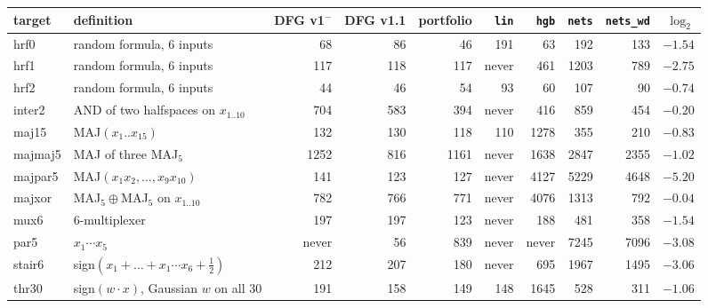 \begin{tabular}{llrrrrrrrr}
\toprule
target & definition & DFG v1$^-$ & DFG v1.1 & portfolio & \texttt{lin} & \texttt{hgb} & \texttt{nets} & \texttt{nets\_wd} & $\log_2$\\
\midrule
hrf0 & random formula, 6 inputs & 68 & 86 & 46 & 191 & 63 & 192 & 133 & $-1.54$\\
hrf1 & random formula, 6 inputs & 117 & 118 & 117 & never & 461 & 1203 & 789 & $-2.75$\\
hrf2 & random formula, 6 inputs & 44 & 46 & 54 & 93 & 60 & 107 & 90 & $-0.74$\\
inter2 & AND of two halfspaces on $x_{1..10}$ & 704 & 583 & 394 & never & 416 & 859 & 454 & $-0.20$\\
maj15 & MAJ$(x_1..x_{15})$ & 132 & 130 & 118 & 110 & 1278 & 355 & 210 & $-0.83$\\
majmaj5 & MAJ of three MAJ$_5$ & 1252 & 816 & 1161 & never & 1638 & 2847 & 2355 & $-1.02$\\
majpar5 & MAJ$(x_1x_2,\dots,x_9x_{10})$ & 141 & 123 & 127 & never & 4127 & 5229 & 4648 & $-5.20$\\
majxor & MAJ$_5\oplus$MAJ$_5$ on $x_{1..10}$ & 782 & 766 & 771 & never & 4076 & 1313 & 792 & $-0.04$\\
mux6 & 6-multiplexer & 197 & 197 & 123 & never & 188 & 481 & 358 & $-1.54$\\
par5 & $x_1\cdots x_5$ & never & 56 & 839 & never & never & 7245 & 7096 & $-3.08$\\
stair6 & sign$(x_1+\dots+x_1\cdots x_6+\tfrac12)$ & 212 & 207 & 180 & never & 695 & 1967 & 1495 & $-3.06$\\
thr30 & sign$(w\cdot x)$, Gaussian $w$ on all 30 & 191 & 158 & 149 & 148 & 1645 & 528 & 311 & $-1.06$\\
\bottomrule
\end{tabular}
